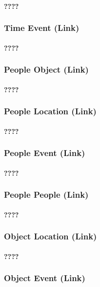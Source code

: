 \paragraph{????}
\subsubsection{Time Event (Link)}
\paragraph{????}
\subsubsection{People Object (Link)}
\paragraph{????}
\subsubsection{People Location (Link)}
\paragraph{????}
\subsubsection{People Event (Link)}
\paragraph{????}
\subsubsection{People People (Link)}
\paragraph{????}
\subsubsection{Object Location (Link)}
\paragraph{????}
\subsubsection{Object Event (Link)}
